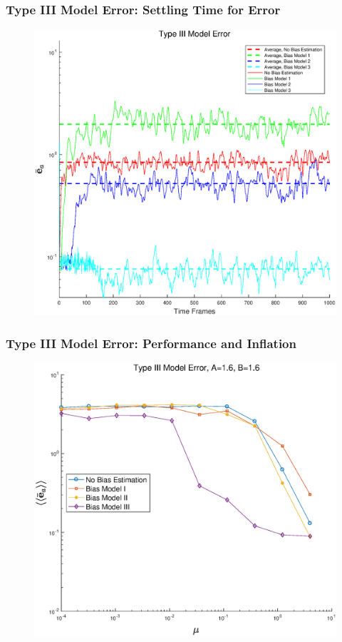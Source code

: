 \documentclass{beamer}
\begin{document}
\begin{frame}
\frametitle{Type III Model Error: Settling Time for Error}
\begin{figure} 
\centering
\includegraphics[scale=0.4]{Figures/ErrVsTimeM3_1}
\end{figure}
\end{frame}

\begin{frame}
\frametitle{Type III Model Error: Performance and Inflation}
\begin{figure} 
\centering
\includegraphics[scale=0.4]{Figures/AErrVsMuM3_1}
\end{figure}
\end{frame}
\end{document}
